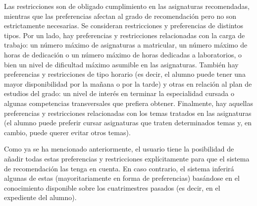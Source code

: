 Las restricciones son de obligado cumplimiento en las asignaturas 
recomendadas, mientras que las preferencias afectan al grado de recomendación 
pero no son estrictamente necesarias. Se consideran restricciones y 
preferencias de distintos tipos. Por un lado, hay preferencias y restricciones 
relacionadas con la carga de trabajo: un número máximo de asignaturas a 
matricular, un número máximo de horas de dedicación o un número máximo de 
horas dedicadas a laboratorios, o bien un nivel de dificultad máximo asumible 
en las asignaturas. También hay preferencias y restricciones de tipo horario 
(es decir, el alumno puede tener una mayor disponibilidad por la mañana o por 
la tarde) y otras en relación al plan de estudios del grado: un nivel de 
interés en terminar la especialidad cursada o algunas competencias 
transversales que prefiera obtener. Finalmente, hay aquellas preferencias y 
restricciones relacionadas con los temas tratados en las asignaturas (el 
alumno puede preferir cursar asignaturas que traten determinados temas y, en 
cambio, puede querer evitar otros temas).

Como ya se ha mencionado anteriormente, el usuario tiene la posibilidad de 
añadir todas estas preferencias y restricciones explícitamente para que el 
sistema de recomendación las tenga en cuenta. En caso contrario, el sistema 
inferirá algunas de estas (mayoritariamente en forma de preferencias) 
basándose en el conocimiento disponible sobre los cuatrimestres pasados (es 
decir, en el expediente del alumno).



